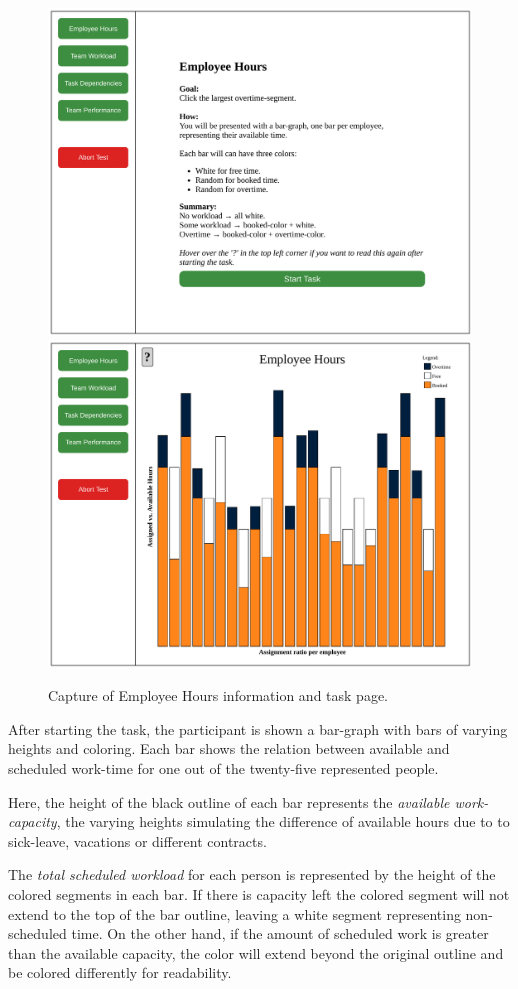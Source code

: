 \documentclass[nofilelist,dvipsnames]{cslthse-msc}
\begin{document}
{        \begin{figure}[h!]
          \centering
          \includegraphics[width=.49\textwidth]{figures/captures/webapp_employee_hours_info.pdf}
          \includegraphics[width=.49\textwidth]{figures/captures/webapp_employee_hours_task.pdf}
          \caption{Capture of Employee Hours information and task page.}
        \end{figure}

        After starting the task, the participant is shown a bar-graph with bars
        of varying heights and coloring. Each bar shows the relation between
        available and scheduled work-time for one out of the twenty-five
        represented people.

        Here, the height of the black outline of each bar represents the
        \textit{available work-capacity}, the varying heights simulating the
        difference of available hours due to to sick-leave, vacations or
        different contracts.

        The \textit{total scheduled workload} for
        each person is represented by the height of the colored segments in
        each bar. If there is capacity left the colored segment will not extend to the
        top of the bar outline, leaving a white segment representing
        non-scheduled time. On the other hand, if the amount of scheduled work
        is greater than the available capacity, the color will extend beyond
        the original outline and be colored differently for readability.

}
\end{document}

